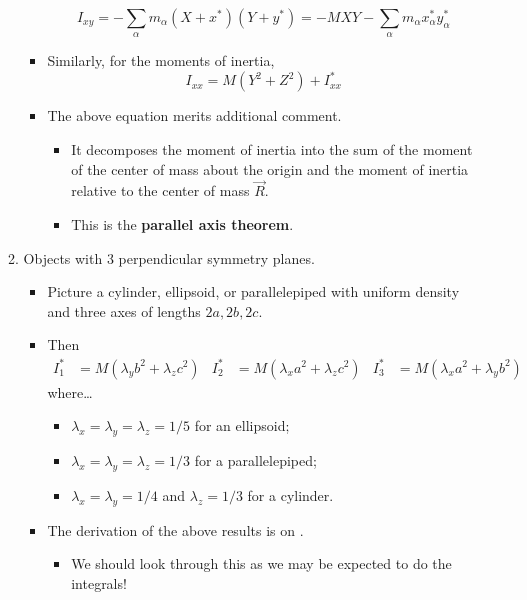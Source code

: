 \documentclass[../notes.tex]{subfiles}
\begin{document}
\begin{itemize}
\begin{enumerate}
\begin{itemize}
\begin{equation*}
                I_{xy} = -\sum_\alpha m_\alpha(X+x^*)(Y+y^*)
                = -MXY-\sum_\alpha m_\alpha x_\alpha^*y_\alpha^*
            \end{equation*}
            \item Similarly, for the moments of inertia,
            \begin{equation*}
                I_{xx} = M(Y^2+Z^2)+I_{xx}^*
            \end{equation*}
            \item The above equation merits additional comment.
            \begin{itemize}
                \item It decomposes the moment of inertia into the sum of the moment of the center of mass about the origin and the moment of inertia relative to the center of mass $\vec{R}$.
                \item This is the \textbf{parallel axis theorem}.
            \end{itemize}
        \end{itemize}
        \item Objects with 3 perpendicular symmetry planes.
        \begin{itemize}
            \item Picture a cylinder, ellipsoid, or parallelepiped with uniform density and three axes of lengths $2a,2b,2c$.
            \item Then
            \begin{align*}
                I_1^* &= M(\lambda_yb^2+\lambda_zc^2)&
                I_2^* &= M(\lambda_xa^2+\lambda_zc^2)&
                I_3^* &= M(\lambda_xa^2+\lambda_yb^2)
            \end{align*}
            where\dots
            \begin{itemize}
                \item $\lambda_x=\lambda_y=\lambda_z=1/5$ for an ellipsoid;
                \item $\lambda_x=\lambda_y=\lambda_z=1/3$ for a parallelepiped;
                \item $\lambda_x=\lambda_y=1/4$ and $\lambda_z=1/3$ for a cylinder.
            \end{itemize}
            \item The derivation of the above results is on \textcite[209-11]{bib:KibbleBerkshire}.
            \begin{itemize}
                \item We should look through this as we may be expected to do the integrals!

\end{itemize}
\end{itemize}
\end{enumerate}
\end{itemize}
\end{document}

